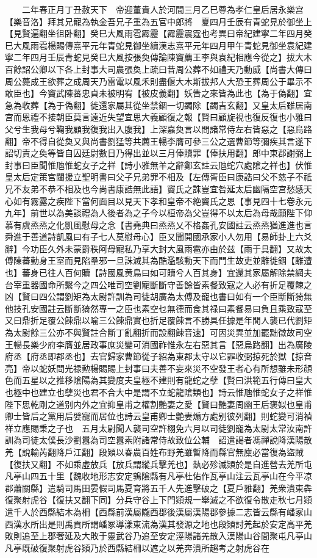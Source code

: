 　　二年春正月丁丑赦天下　帝迎董貴人於河間三月乙巳尊為孝仁皇后居永樂宫【樂音洛】拜其兄寵為執金吾兄子重為五官中郎將　夏四月壬辰有青蛇見於御坐上【見賢遍翻坐徂卧翻】癸巳大風雨雹霹靂【霹靂震霆也考異曰帝紀建寧二年四月癸巳大風雨雹楊賜傳熹平元年青蛇見御坐續漢志熹平元年四月甲午青蛇見御坐袁紀建寧二年四月壬辰青蛇見癸巳大風按張奐傳論陳竇薦王李與袁紀相應今從之】拔大木百餘詔公卿以下各上封事大司農張奐上疏曰昔周公葬不如禮天乃動威【尚書大傳曰周公薨成王欲葬之成周天乃雷電以風禾則盡偃大木斯拔邦人大恐王葬周公于畢示不敢臣也】今竇武陳蕃忠貞未被明宥【被皮義翻】妖眚之來皆為此也【為于偽翻】宜急為收葬【為于偽翻】徙還家屬其從坐禁錮一切蠲除【蠲吉玄翻】又皇太后雖居南宫而恩禮不接朝臣莫言遠近失望宜思大義顧復之報【賢曰顧旋視也復反復也小雅曰父兮生我母兮鞠我顧我復我出入腹我】上深嘉奐言以問諸常侍左右皆惡之【惡烏路翻】帝不得自從奐又與尚書劉猛等共薦王暢李膺可參三公之選曹節等彌疾其言遂下詔切責之奐等皆自囚廷尉數日乃得出並以三月俸贖罪【俸扶用翻】郎中東郡謝弼上封事曰臣聞惟虺惟蛇女子之祥【詩小雅無羊之辭鄭玄註云虺蛇穴處隂之祥也】伏惟皇太后定策宫闥援立聖明書曰父子兄弟罪不相及【左傳胥臣曰康誥曰父不慈子不祇兄不友弟不恭不相及也今尚書康誥無此語】竇氏之誅豈宜咎延太后幽隔空宫愁感天心如有霧露之疾陛下當何面目以見天下孝和皇帝不絶竇氏之恩【事見四十七卷永元九年】前世以為美談禮為人後者為之子今以桓帝為父豈得不以太后為母哉願陛下仰慕有虞烝烝之化凱風慰母之念【書堯典曰烝烝乂不格姦孔安國註云烝烝猶進進也言舜進于善道詩凱風曰有子七人莫慰母心】臣又聞開國承家小人勿用【易師卦上六爻辭】今功臣久外未蒙爵秩阿母寵私乃享大封大風雨雹亦由於兹【雨于具翻】又故太傅陳蕃勤身王室而見陷羣邪一旦誅滅其為酷濫駭動天下而門生故吏並離徙錮【離遭也】蕃身已往人百何贖【詩國風黄鳥曰如可贖兮人百其身】宜還其家屬解除禁網夫台宰重器國命所繫今之四公唯司空劉寵斷斷守善餘皆素餐致寇之人必有折足覆餗之凶【賢曰四公謂劉矩為太尉許訓為司徒胡廣為太傅及寵也書曰如有一个臣斷斷猗無他技孔安國註云斷斷猗然專一之臣也素空乜無德而食其禄曰素餐易曰負且乘致寇至又曰鼎折足覆公餗鼎以喻三公餗鼎實也折足覆餗言不勝具任據是年閒人襲已代劉矩為太尉餘三公亦不與賢註合斷丁亂翻折而設翻餗音速】可因災異並加罷黜徵故司空王暢長樂少府李膺並居政事庶災變可消國祚惟永左右惡其言【惡烏路翻】出為廣陵府丞【府丞即郡丞也】去官歸家曹節從子紹為東郡太守以它罪收弼掠死於獄【掠音亮】帝以蛇妖問光禄勲楊賜賜上封事曰夫善不妄來災不空發王者心有所想雖未形顔色而五星以之推移隂陽為其變度夫皇極不建則有龍蛇之孽【賢曰洪範五行傳曰皇大也極中也建立也孽災也君不合大中是謂不立蛇龍隂類也】詩云惟虺惟蛇女子之祥惟陛下思乾剛之道别内外之宜抑皇甫之權割艶妻之愛【賢曰艶妻周幽王后褒姒也皇甫卿士皆后之黨用后嬖寵而居位也詩云皇甫卿士艶妻煽方處别彼列翻】則蛇變可消禎祥立應賜秉之子也　五月太尉聞人襲司空許栩免六月以司徒劉寵為太尉太常汝南許訓為司徒太僕長沙劉囂為司空囂素附諸常侍故致位公輔　詔遣謁者馮禪說降漢陽散羌【說輸芮翻降戶江翻】段熲以春農百姓布野羌雖暫降而縣官無廩必當復為盜賊【復扶又翻】不如乘虛放兵【放兵謂縱兵擊羌也】埶必殄滅熲於是自進營去羌所屯凡亭山四五十里【魏收地形志安定鶉隂縣有凡亭杜佑作瓦亭山注云瓦亭山在今平凉郡蕭關縣】遣騎司馬田晏假司馬夏育將五千人先進擊破之【夏戶雅翻】羌衆潰東犇復聚射虎谷【復扶又翻下同】分兵守谷上下門熲規一舉滅之不欲復令散走秋七月熲遣千人於西縣結木為柵【西縣前漢屬隴西郡後漢屬漢陽郡參據二志皆云縣有嶓冢山西漢水所出是則禹貢所謂嶓冢導漾東流為漢其發源之地也段熲討羌起於安定高平羌敗則追至上郡奢延及大敗于靈武谷乃追至安定涇陽諸羌散入漢陽山谷間聚屯凡亭山凡亭既破復聚射虎谷熲乃於西縣結柵以遮之以羌奔潰所趨考之射虎谷在